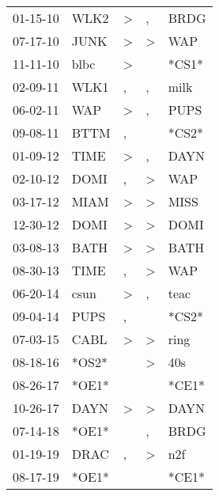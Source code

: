 \begin{supertabular}{lllll}
 01-15-10 &   WLK2 &     \textgreater &             , &   BRDG \\
 07-17-10 &   JUNK &     \textgreater &  \textgreater &    WAP \\
 11-11-10 &   blbc &     \textgreater &               &  *CS1* \\
 02-09-11 &   WLK1 &                , &             , &   milk \\
 06-02-11 &    WAP &     \textgreater &             , &   PUPS \\
 09-08-11 &   BTTM &                , &               &  *CS2* \\
 01-09-12 &   TIME &     \textgreater &             , &   DAYN \\
 02-10-12 &   DOMI &                , &  \textgreater &    WAP \\
 03-17-12 &   MIAM &     \textgreater &  \textgreater &   MISS \\
 12-30-12 &   DOMI &     \textgreater &  \textgreater &   DOMI \\
 03-08-13 &   BATH &     \textgreater &  \textgreater &   BATH \\
 08-30-13 &   TIME &                , &  \textgreater &    WAP \\
 06-20-14 &   csun &     \textgreater &             , &   teac \\
 09-04-14 &   PUPS &                , &               &  *CS2* \\
 07-03-15 &   CABL &     \textgreater &  \textgreater &   ring \\
 08-18-16 &  *OS2* &                  &  \textgreater &    40s \\
 08-26-17 &  *OE1* &                  &               &  *CE1* \\
 10-26-17 &   DAYN &     \textgreater &  \textgreater &   DAYN \\
 07-14-18 &  *OE1* &                  &             , &   BRDG \\
 01-19-19 &   DRAC &                , &  \textgreater &    n2f \\
 08-17-19 &  *OE1* &                  &               &  *CE1* \\
\end{supertabular}

